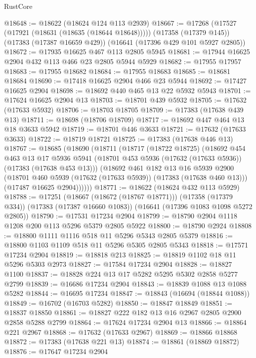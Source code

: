 \begin{lexlean}{RustCore}
\begin{coremodule}
@18648 := @18622 (@18624 @124 @113 @2939)
@18667 := @17268
    (@17527 (@17921 (@18631 (@18635 (@18644 @18648)))))
    (@17358 (@17379 @145))
    (@17383 (@17387 @16659 @429))
    (@16641 (@17396 @429 @101 @5927 @2805))
@18672 := @17935 @16625 @467 @113 @2805 @5945
@18681 := @17944 @16625 @2904 @432 @113 @466 @23 @2805 @5944 @5929
@18682 := @17955 @17957
@18683 := @17955 @18682
@18684 := @17955 @18683
@18685 := @18681 @18684
@18690 := @17418 @16625 @2904 @466 @23 @5944
@18692 := @17427 @16625 @2904
@18698 := @18692 @440 @465 @13 @22 @5932 @5943
@18701 := @17624 @16625 @2904 @13
@18703 := @18701 @439 @5932
@18705 := @17632 (@17633 @5932)
@18706 := @18703 @18705
@18709 := @17383 (@17638 @439 @13)
@18711 := @18698 (@18706 @18709)
@18717 := @18692 @447 @464 @13 @18 @3633 @5942
@18719 := @18701 @446 @3633
@18721 := @17632 (@17633 @3633)
@18722 := @18719 @18721
@18725 := @17383 (@17638 @446 @13)
@18767 := @18685
    (@18690
      (@18711
        (@18717
          (@18722 @18725)
          (@18692
            @454
            @463
            @13
            @17
            @5936
            @5941
            (@18701 @453 @5936 (@17632 (@17633 @5936)) (@17383 (@17638 @453 @13)))
            (@18692
              @461
              @182
              @13
              @16
              @5939
              @2900
              (@18701 @460 @5939 (@17632 (@17633 @5939)) (@17383 (@17638 @460 @13)))
              (@17487 @16625 @2904))))))
@18771 := @18622 (@18624 @432 @113 @5929)
@18788 := @17251
    (@18667 (@18672 (@18767 @18771)))
    (@17358 (@17379 @334))
    (@17383 (@17387 @16660 @1083))
    (@16641 (@17396 @1083 @1098 @5272 @2805))
@18790 := @17531 @17234 @2904
@18799 := @18790 @2904 @1118 @1208 @200 @113 @5296 @5379 @2805 @5922
@18800 := @18790 @2924
@18808 := @18800 @1111 @1116 @518 @11 @5296 @5343 @2805 @5379
@18816 := @18800 @1103 @1109 @518 @11 @5296 @5305 @2805 @5343
@18818 := @17571 @17234 @2904
@18819 := @18818 @213
@18825 := @18819 @1102 @18 @11 @5296 @5303 @2973
@18827 := @17584 @17234 @2904
@18828 := @18827 @1100
@18837 := @18828 @224 @13 @17 @5282 @5295 @5302 @2858 @5277 @2799
@18839 := @16686 @17234 @2904
@18843 := @18839 @1088 @13 @1088 @5282
@18844 := @16695 @17234
@18847 := @18843 (@16694 (@18844 @1088))
@18849 := @16702 (@16703 @5282)
@18850 := @18847 @18849
@18851 := @18837 @18850
@18861 := @18827 @222 @182 @13 @16 @2967 @2805 @2900 @2858 @5288 @2799
@18864 := @17624 @17234 @2904 @13
@18866 := @18864 @221 @2967
@18868 := @17632 (@17633 @2967)
@18869 := @18866 @18868
@18872 := @17383 (@17638 @221 @13)
@18874 := @18861 (@18869 @18872)
@18876 := @17647 @17234 @2904

\end{coremodule}
\end{lexlean}
